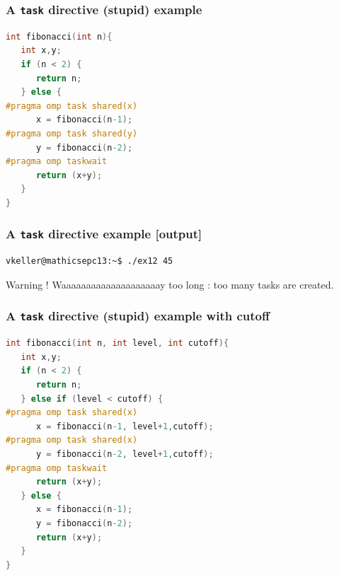 \begin{frame}[containsverbatim]
\frametitle{A \texttt{task} directive (stupid) example}
\begin{lstlisting}[language=C,frame=lines]
int fibonacci(int n){
   int x,y;
   if (n < 2) {
      return n;
   } else {
#pragma omp task shared(x)
      x = fibonacci(n-1);
#pragma omp task shared(y)
      y = fibonacci(n-2);
#pragma omp taskwait
      return (x+y);
   }
}
\end{lstlisting}
\end{frame}

\begin{frame}[containsverbatim]
\frametitle{A \texttt{task} directive example [output]}
\begin{verbatim}
vkeller@mathicsepc13:~$ ./ex12 45
\end{verbatim}

\begin{alertblock}{Warning !}
Waaaaaaaaaaaaaaaaaaaay too long : too many tasks are created.
\end{alertblock}

\end{frame}

\begin{frame}[containsverbatim]
\frametitle{A \texttt{task} directive (stupid) example with cutoff}
\begin{lstlisting}[language=C,frame=lines]
int fibonacci(int n, int level, int cutoff){
   int x,y;
   if (n < 2) {
      return n;
   } else if (level < cutoff) {
#pragma omp task shared(x)
      x = fibonacci(n-1, level+1,cutoff);
#pragma omp task shared(x)
      y = fibonacci(n-2, level+1,cutoff);
#pragma omp taskwait
      return (x+y);
   } else {
      x = fibonacci(n-1);
      y = fibonacci(n-2);
      return (x+y);
   }
}
\end{lstlisting}
\end{frame}


